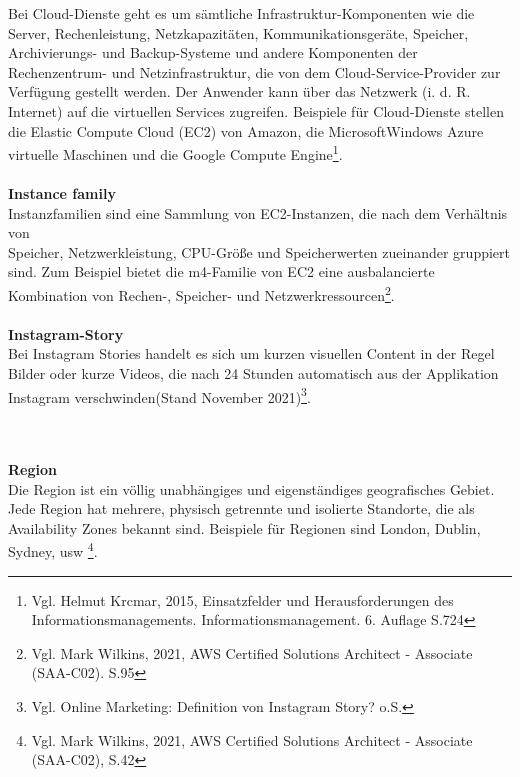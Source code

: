 Bei Cloud-Dienste geht es um sämtliche
Infrastruktur-Komponenten wie die Server, Rechenleistung, Netzkapazitäten, Kommunikationsgeräte, Speicher, Archivierungs- und Backup-Systeme und andere Komponenten der Rechenzentrum- und Netzinfrastruktur, die von dem Cloud-Service-Provider zur Verfügung gestellt werden. Der Anwender kann über das Netzwerk (i. d. R. Internet) auf die virtuellen Services zugreifen. Beispiele für Cloud-Dienste stellen die Elastic Compute Cloud (EC2) von Amazon, die MicrosoftWindows Azure virtuelle Maschinen und die Google Compute Engine\footnote{Vgl. Helmut Krcmar, 2015, Einsatzfelder und Herausforderungen des Informationsmanagements. Informationsmanagement. 6. Auflage S.724\cite{IM1}}.
\\\\
\textbf{Instance family}\\
Instanzfamilien sind eine Sammlung von EC2-Instanzen, die nach dem Verhältnis von\\ Speicher, Netzwerkleistung, CPU-Größe und Speicherwerten zueinander gruppiert sind. Zum Beispiel bietet die m4-Familie von EC2 eine ausbalancierte Kombination von Rechen-, Speicher- und Netzwerkressourcen\footnote{Vgl. Mark Wilkins, 2021, AWS Certified Solutions Architect - Associate (SAA-C02). S.95\cite{AWS1}}.
\\\\
\textbf{Instagram-Story}\\
Bei Instagram Stories handelt es sich um kurzen visuellen Content in der Regel Bilder oder kurze Videos, die nach 24 Stunden automatisch aus der Applikation Instagram verschwinden(Stand November 2021)\footnote{Vgl. Online Marketing: Definition von Instagram Story? o.S.\cite{IG2}}.

\\\\
\textbf{Region}\\
Die Region ist ein völlig unabhängiges und eigenständiges geografisches Gebiet. Jede Region hat mehrere, physisch getrennte und isolierte Standorte, die als Availability Zones bekannt sind. Beispiele für Regionen sind London, Dublin, Sydney, usw \footnote{Vgl. Mark Wilkins, 2021, AWS Certified Solutions Architect - Associate (SAA-C02)\cite{AWS1}, S.42}.
